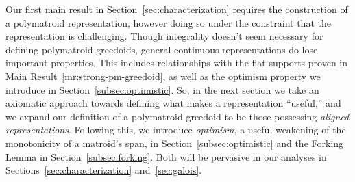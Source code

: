 \documentclass[11pt]{article}
\begin{document}
Our first main result in Section~\ref{sec:characterization} requires the construction of a polymatroid representation, however doing so under the constraint that the representation is challenging.
Though integrality doesn't seem necessary for defining polymatroid greedoids, general continuous representations do lose important properties.
This includes relationships with the flat supports proven in Main Result~\ref{mr:strong-pm-greedoid}, as well as the optimism property we introduce in Section~\ref{subsec:optimistic}.
So, in the next section we take an axiomatic approach towards defining what makes a representation ``useful,'' and we expand our definition of a polymatroid greedoid to be those possessing \emph{aligned representations}.
Following this, we introduce \emph{optimism}, a useful weakening of the monotonicity of a matroid's span, in Section~\ref{subsec:optimistic} and the Forking Lemma in Section~\ref{subsec:forking}.
Both will be pervasive in our analyses in Sections~\ref{sec:characterization} and~\ref{sec:galois}.
\end{document}
